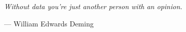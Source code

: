 


\vspace*{10cm}

    \vspace*{10cm}
    
    
\begin{flushright}
\textit{Without data you're just another person with an opinion.}
\end{flushright}
\begin{flushright}
\vspace*{-0.3cm}
— William Edwards Deming
\end{flushright}
	
\newpage